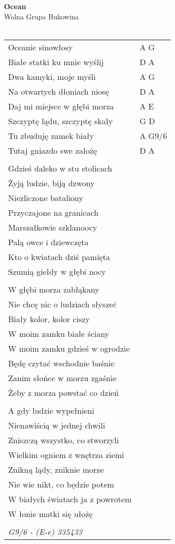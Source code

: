 \documentclass[a5paper]{article}
\begin{document}


\noindent
\fontsize{12pt}{15pt}\selectfont
\textbf{Ocean} \\
\fontsize{8pt}{10pt}\selectfont
Wolna Grupa Bukowina \\ \\
\fontsize{10pt}{12pt}\selectfont
{}
\begin{tabular}{@{}p{7.50cm}p{3cm}@{}}
\noindent
Oceanie sinowłosy & A G \\
Białe statki ku mnie wyślij & D A \\
Dwa kamyki, moje myśli & A G \\
Na otwartych dłoniach niosę & D A \\
Daj mi miejsce w głębi morza & A E \\
Szczyptę lądu, szczyptę skały & G D \\
Tu zbuduję zamek biały & A G9/6 \\
Tutaj gniazdo swe założę & D A \\ \\
 
Gdzieś daleko w stu stolicach \\
Żyją ludzie, biją dzwony \\
Niezliczone bataliony \\
Przyczajone na granicach \\
Marszałkowie szklanoocy \\
Palą owce i dziewczęta \\
Kto o kwiatach dziś pamięta \\
Szumią giełdy w głębi nocy \\ \\
 
W głębi morza zabłąkany \\
Nie chcę nic o ludziach słyszeć \\
Biały kolor, kolor ciszy \\
W moim zamku białe ściany \\
W moim zamku gdzieś w ogrodzie \\
Będę czytać wschodnie baśnie \\
Zanim słońce w morzu zgaśnie \\
Żeby z morza powstać co dzień \\ \\
 
A gdy ludzie wypełnieni \\
Nienawiścią w jednej chwili \\
Zniszczą wszystko, co stworzyli \\
Wielkim ogniem z wnętrza ziemi \\
Znikną lądy, zniknie morze \\
Nie wie nikt, co będzie potem \\
W białych światach ja z powrotem \\
W łonie matki się ułożę \\ \\

\emph{G9/6 - (E-e) 335433}
\end{tabular}
\end{document}
